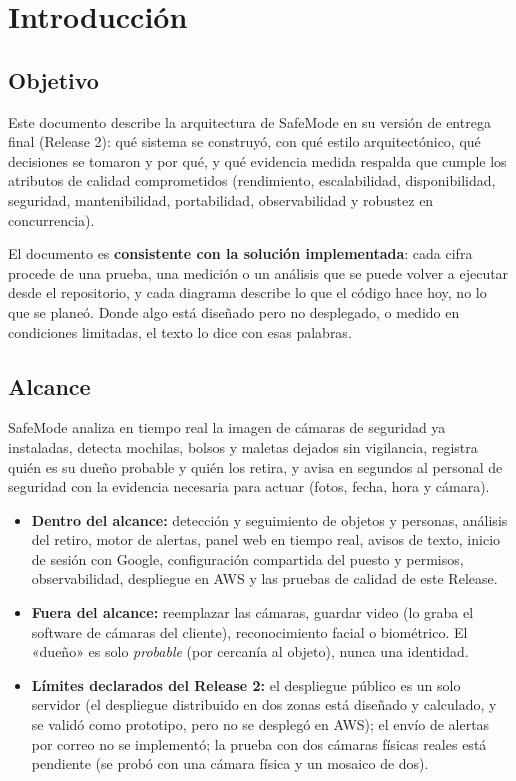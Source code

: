 \chapter{Introducción}

\section{Objetivo}
Este documento describe la arquitectura de SafeMode en su versión de entrega final (Release 2): qué sistema se construyó, con qué estilo
arquitectónico, qué decisiones se tomaron y por qué, y qué evidencia medida respalda que cumple los atributos de calidad comprometidos
(rendimiento, escalabilidad, disponibilidad, seguridad, mantenibilidad, portabilidad, observabilidad y robustez en concurrencia).

El documento es \textbf{consistente con la solución implementada}: cada cifra procede de una prueba, una medición o un análisis que se puede
volver a ejecutar desde el repositorio, y cada diagrama describe lo que el código hace hoy, no lo que se planeó. Donde algo está diseñado
pero no desplegado, o medido en condiciones limitadas, el texto lo dice con esas palabras.

\section{Alcance}
SafeMode analiza en tiempo real la imagen de cámaras de seguridad ya instaladas, detecta mochilas, bolsos y maletas dejados sin vigilancia,
registra quién es su dueño probable y quién los retira, y avisa en segundos al personal de seguridad con la evidencia necesaria para
actuar (fotos, fecha, hora y cámara).

\begin{itemize}
  \item \textbf{Dentro del alcance:} detección y seguimiento de objetos y personas, análisis del retiro, motor de alertas, panel web en tiempo
  real, avisos de texto, inicio de sesión con Google, configuración compartida del puesto y permisos, observabilidad, despliegue en AWS y las
  pruebas de calidad de este Release.
  \item \textbf{Fuera del alcance:} reemplazar las cámaras, guardar video (lo graba el software de cámaras del cliente), reconocimiento facial
  o biométrico. El «dueño» es solo \emph{probable} (por cercanía al objeto), nunca una identidad.
  \item \textbf{Límites declarados del Release 2:} el despliegue público es un solo servidor (el despliegue distribuido en dos zonas está
  diseñado y calculado, y se validó como prototipo, pero no se desplegó en AWS); el envío de alertas por correo no se implementó; la prueba con
  dos cámaras físicas reales está pendiente (se probó con una cámara física y un mosaico de dos).
\end{itemize}

